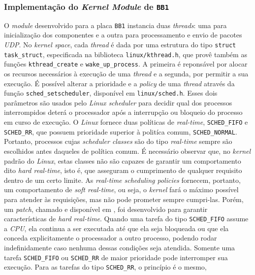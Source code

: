 \subsubsection{Implementação do \textit{Kernel Module} de \texttt{BB1}}
\label{sec:bb1}

O \textit{module} desenvolvido para a placa \texttt{BB1} instancia duas
\textit{threads}: uma para inicialização dos componentes e a outra para
processamento e envio de pacotes \textit{UDP}. No \textit{kernel space}, cada
\textit{thread} é dada por uma estrutura do tipo \texttt{struct task\_struct},
especificada na biblioteca \texttt{linux/kthread.h}, que provê também as funções
\texttt{kthread\_create} e \texttt{wake\_up\_process}. A primeira é reponsável
por alocar os recursos necessários à execução de uma \textit{thread} e a
segunda, por permitir a sua execução. É possível alterar a prioridade e a
\textit{policy} de uma \textit{thread} através da função
\texttt{sched\_setscheduler}, disponível em \texttt{linux/sched.h}. Esses dois
parâmetros são usados pelo \textit{Linux scheduler} para decidir qual dos
processos interrompidos deterá o processador após a interrupção ou bloqueio do
processo em curso de execução. O \textit{Linux} fornece duas políticas de
\textit{real-time}, \texttt{SCHED\_FIFO} e \texttt{SCHED\_RR}, que possuem
prioridade superior à politíca comum, \texttt{SCHED\_NORMAL}. Portanto,
processos cujas \textit{scheduler classes} são do tipo \textit{real-time} sempre
são escolhidos antes daqueles de política comum. É necessário observar que,  no
\textit{kernel} padrão do \textit{Linux},  estas classes não são capazes de
garantir um comportamento dito \textit{hard real-time}\cite{linuxlove}, isto é,
que asseguram o cumprimento de qualquer requisito dentro de um certo limite. As
\textit{real-time scheduling policies} fornecem, portanto, um comportamento de
\textit{soft real-time}, ou seja, o \textit{kernel} fará o máximo possível para
atender às requisições, mas não pode prometer sempre cumpri-las. Porém, um
\textit{patch}, chamado  e disponível em
\cite{rt}, foi desenvolvido para garantir características
de \textit{hard real-time}. Quando uma tarefa do tipo \texttt{SCHED\_FIFO}
assume a \textit{CPU}, ela continua a ser executada até que ela seja bloqueada
ou que ela conceda explicitamente o processador a outro processo, podendo rodar
indefinidamente caso nenhuma dessas condições seja atendida. Somente uma tarefa
\texttt{SCHED\_FIFO} ou \texttt{SCHED\_RR} de maior prioridade pode interromper
sua execução. Para as tarefas do tipo \texttt{SCHED\_RR}, o princípio é o mesmo,
